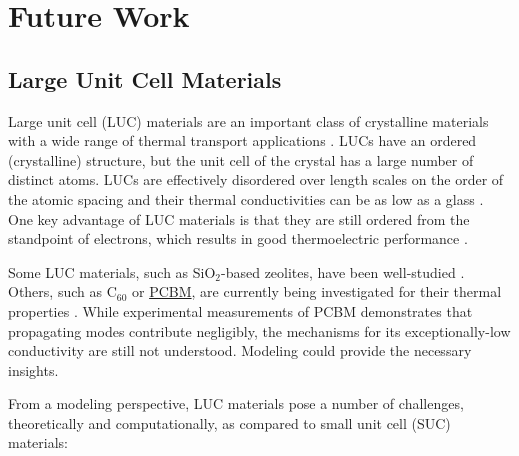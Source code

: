 \section{\label{Future}Future Work}

\subsection{\label{Future:LUC}Large Unit Cell Materials}

Large unit cell (LUC) materials are an important class of crystalline 
materials with a wide range of thermal transport applications 
\cite{nolas_effect_1998,nolas_skutterudites:_1999,
mcgaughey_thermal_2004,mcgaughey_phonon_2004,ong_surface_2013}. 
LUCs have an ordered (crystalline) structure, but 
the unit cell of the crystal has a large number 
of distinct atoms. LUCs are effectively disordered 
over length scales on the order of the atomic spacing and their thermal 
conductivities can be as low as a glass \cite{cahill_lower_1992}. 
One key advantage of LUC materials is that they are still ordered 
from the standpoint of electrons, which results in good thermoelectric 
performance 
\cite{he_thermoelectric_2006,yang_effect_2006,wang_thermoelectric_2007}. 

Some LUC materials, such as SiO$_2$-based zeolites, have been 
well-studied \cite{mcgaughey_thermal_2004}. 
Others, such as C$_{60}$\cite{olson_specific_1993} or 
\href{http://en.wikipedia.org/wiki/Phenyl-C61-butyric_acid_methyl_ester}
{PCBM}, are currently being investigated for their thermal properties 
\cite{duda_exceptionally_2013}. 
While experimental measurements of PCBM demonstrates that propagating 
modes contribute negligibly, the mechanisms for 
its exceptionally-low conductivity are still not understood. Modeling 
could provide the necessary insights. 

From a modeling perspective, LUC materials pose a number of challenges,
theoretically and computationally, as compared to small unit cell 
(SUC) materials:

